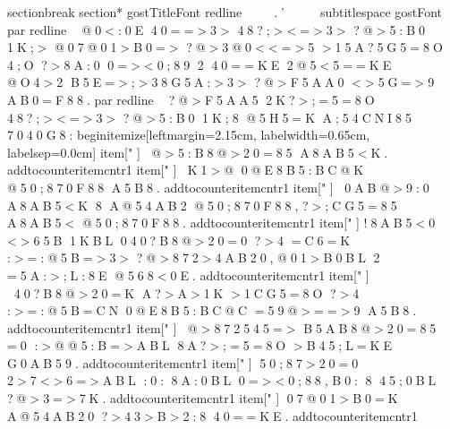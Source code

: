 
 
 
 
 \ s e c t i o n b r e a k   \ s e c t i o n * { 
 
 	 \ g o s t T i t l e F o n t 
 
 	 \ r e d l i n e 
 
 	 .'
 
 } 
 
 
 
 
 
 
 
 \ s u b t i t l e s p a c e 
 
 
 
 { \ g o s t F o n t 
 
 	 \ p a r   \ r e d l i n e     @0<:0E  40==>3>  48?;><=>3>  ?@>5:B0  1K;>  @07@01>B0=>  ?@>3@0<<=>5  >15A?5G5=8O  4;O  ?>8A:0  0=><0;89  2  40==KE  2@5<5==KE  @O4>2  B5E=>;>38G5A:>3>  ?@>F5AA0  <>5G=>9  AB0=F88.   
 
 	 \ p a r   \ r e d l i n e     ?@>F5AA5  2K?>;=5=8O  48?;><=>3>  ?@>5:B0  1K;8  @5H5=K  A;54CNI85  7040G8: 
 
 	 
 
 	 \ b e g i n { i t e m i z e } [ l e f t m a r g i n = 2 . 1 5 c m ,   l a b e l w i d t h = 0 . 6 5 c m ,   l a b e l s e p = 0 . 0 c m ]   
 
 	 	 
 
 	 	 \ i t e m [ "   ]   @>5:B8@>20=85  A8AB5<K. 	 	 
 
 	 	 \ a d d t o c o u n t e r { i t e m c n t r } { 1 } 
 
 	 	 
 
 	 	 \ i t e m [ "   ]   K1>@  0@E8B5:BC@K  @50;870F88  A5B8. 	 	 
 
 	 	 \ a d d t o c o u n t e r { i t e m c n t r } { 1 } 
 
 	 	 
 
 	 	 \ i t e m [ "   ]   0AB@>9:0  A8AB5<K  8  A@54AB2  @50;870F88,   ?>;CG5=85  A8AB5<  @50;870F88.   	 	 
 
 	 	 \ a d d t o c o u n t e r { i t e m c n t r } { 1 } 
 
 	 	 
 
 	 	 \ i t e m [ "   ]   !8AB5<0  <>65B  1KBL  040?B8@>20=0  ?>4  =C6=K  :>=:@5B=>3>  ?@>872>4AB20,   @01>B0BL  2  =5A:>;L:8E  @568<0E. 	 	 
 
 	 	 \ a d d t o c o u n t e r { i t e m c n t r } { 1 } 
 
 	 	 
 
 	 	 \ i t e m [ "   ]   40?B8@>20=K  A?>A>1K  >1CG5=8O  ?>4  :>=:@5B=CN  0@E8B5:BC@C  =59@>==>9  A5B8. 	 	 
 
 	 	 \ a d d t o c o u n t e r { i t e m c n t r } { 1 } 
 
 	 	 
 
 	 	 \ i t e m [ "   ]   @>872545=>  B5AB8@>20=85  =0  :>@@5:B=>ABL  8A?>;=5=8O  >B45;L=KE  G0AB59. 	 	 
 
 	 	 \ a d d t o c o u n t e r { i t e m c n t r } { 1 } 
 
 	 	 
 
 	 	 \ i t e m [ "   ]    50;87>20=0  2>7<>6=>ABL  :0:  8A:0BL  0=><0;88,   B0:  8  45;0BL  ?@>3=>7K. 	 	 
 
 	 	 \ a d d t o c o u n t e r { i t e m c n t r } { 1 } 
 
 	 	 
 
 	 	 \ i t e m [ "   ]    07@01>B0=K  A@54AB20  ?>43>B>2:8  40==KE. 	 	 
 
 	 	 \ a d d t o c o u n t e r { i t e m c n t r } { 1 } 
}
